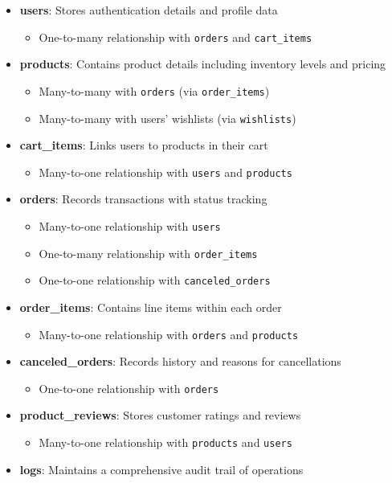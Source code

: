 \documentclass[14pt,a4paper]{article}
\begin{document}
\begin{itemize}
    \item \textbf{users}: Stores authentication details and profile data
        \begin{itemize}
            \item One-to-many relationship with \texttt{orders} and \texttt{cart\_items}
        \end{itemize}
    \item \textbf{products}: Contains product details including inventory levels and pricing
        \begin{itemize}
            \item Many-to-many with \texttt{orders} (via \texttt{order\_items})
            \item Many-to-many with users' wishlists (via \texttt{wishlists})
        \end{itemize}
    \item \textbf{cart\_items}: Links users to products in their cart
        \begin{itemize}
            \item Many-to-one relationship with \texttt{users} and \texttt{products}
        \end{itemize}
    \item \textbf{orders}: Records transactions with status tracking
        \begin{itemize}
            \item Many-to-one relationship with \texttt{users}
            \item One-to-many relationship with \texttt{order\_items}
            \item One-to-one relationship with \texttt{canceled\_orders}
        \end{itemize}
    \item \textbf{order\_items}: Contains line items within each order
        \begin{itemize}
            \item Many-to-one relationship with \texttt{orders} and \texttt{products}
        \end{itemize}
    \item \textbf{canceled\_orders}: Records history and reasons for cancellations
        \begin{itemize}
            \item One-to-one relationship with \texttt{orders}
        \end{itemize}
    \item \textbf{product\_reviews}: Stores customer ratings and reviews
        \begin{itemize}
            \item Many-to-one relationship with \texttt{products} and \texttt{users}
        \end{itemize}
    \item \textbf{logs}: Maintains a comprehensive audit trail of operations
\end{itemize}
\end{document}
